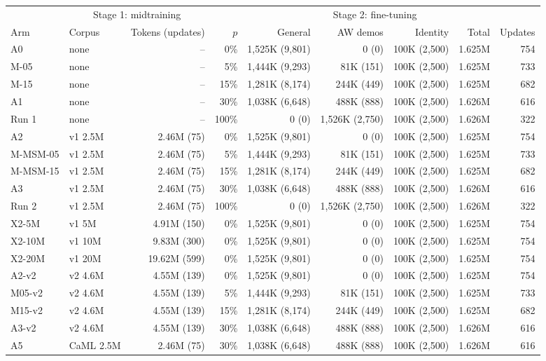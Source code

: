 \begin{tabular}{llrrrrrrr}
\toprule
 & \multicolumn{2}{c}{Stage 1: midtraining} & \multicolumn{6}{c}{Stage 2: fine-tuning} \\
\cmidrule(lr){2-3}\cmidrule(lr){4-9}
Arm & Corpus & Tokens (updates) & $p$ & General & AW demos & Identity & Total & Updates \\
\midrule
A0 & none & -- & 0\% & 1{,}525K (9{,}801) & 0 (0) & 100K (2{,}500) & 1.625M & 754 \\
M-05 & none & -- & 5\% & 1{,}444K (9{,}293) & 81K (151) & 100K (2{,}500) & 1.625M & 733 \\
M-15 & none & -- & 15\% & 1{,}281K (8{,}174) & 244K (449) & 100K (2{,}500) & 1.625M & 682 \\
A1 & none & -- & 30\% & 1{,}038K (6{,}648) & 488K (888) & 100K (2{,}500) & 1.626M & 616 \\
Run 1 & none & -- & 100\% & 0 (0) & 1{,}526K (2{,}750) & 100K (2{,}500) & 1.626M & 322 \\
\midrule
A2 & v1 2.5M & 2.46M (75) & 0\% & 1{,}525K (9{,}801) & 0 (0) & 100K (2{,}500) & 1.625M & 754 \\
M-MSM-05 & v1 2.5M & 2.46M (75) & 5\% & 1{,}444K (9{,}293) & 81K (151) & 100K (2{,}500) & 1.625M & 733 \\
M-MSM-15 & v1 2.5M & 2.46M (75) & 15\% & 1{,}281K (8{,}174) & 244K (449) & 100K (2{,}500) & 1.625M & 682 \\
A3 & v1 2.5M & 2.46M (75) & 30\% & 1{,}038K (6{,}648) & 488K (888) & 100K (2{,}500) & 1.626M & 616 \\
Run 2 & v1 2.5M & 2.46M (75) & 100\% & 0 (0) & 1{,}526K (2{,}750) & 100K (2{,}500) & 1.626M & 322 \\
\midrule
X2-5M & v1 5M & 4.91M (150) & 0\% & 1{,}525K (9{,}801) & 0 (0) & 100K (2{,}500) & 1.625M & 754 \\
X2-10M & v1 10M & 9.83M (300) & 0\% & 1{,}525K (9{,}801) & 0 (0) & 100K (2{,}500) & 1.625M & 754 \\
X2-20M & v1 20M & 19.62M (599) & 0\% & 1{,}525K (9{,}801) & 0 (0) & 100K (2{,}500) & 1.625M & 754 \\
\midrule
A2-v2 & v2 4.6M & 4.55M (139) & 0\% & 1{,}525K (9{,}801) & 0 (0) & 100K (2{,}500) & 1.625M & 754 \\
M05-v2 & v2 4.6M & 4.55M (139) & 5\% & 1{,}444K (9{,}293) & 81K (151) & 100K (2{,}500) & 1.625M & 733 \\
M15-v2 & v2 4.6M & 4.55M (139) & 15\% & 1{,}281K (8{,}174) & 244K (449) & 100K (2{,}500) & 1.625M & 682 \\
A3-v2 & v2 4.6M & 4.55M (139) & 30\% & 1{,}038K (6{,}648) & 488K (888) & 100K (2{,}500) & 1.626M & 616 \\
\midrule
A5 & CaML 2.5M & 2.46M (75) & 30\% & 1{,}038K (6{,}648) & 488K (888) & 100K (2{,}500) & 1.626M & 616 \\
\bottomrule
\end{tabular}
